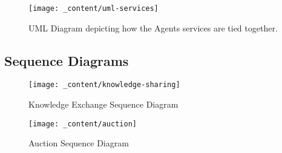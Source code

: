 \begin{figure}[H]
    \centering
    \texttt{[image: \_content/uml-services]}
    \caption{UML Diagram depicting how the Agents services are tied together.}
    \label{fig:uml-services}
\end{figure}

\subsection{Sequence Diagrams}
\label{ssec:sequence-diagrams}
\begin{figure}[H]
    \centering
    \texttt{[image: \_content/knowledge-sharing]}
    \caption{Knowledge Exchange Sequence Diagram}
    \label{fig:knowledge-sharing}
\end{figure}

\begin{figure}[H]
    \centering
    \texttt{[image: \_content/auction]}
    \caption{Auction Sequence Diagram}
    \label{fig:auction}
\end{figure}

